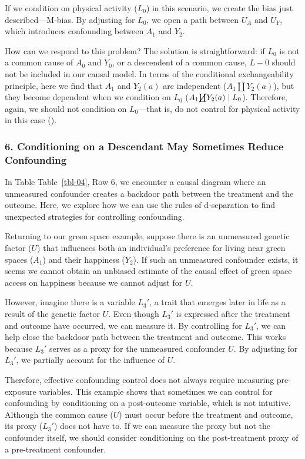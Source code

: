 \documentclass[
  singlecolumn]{article}
\begin{document}
If we condition on physical activity (\(L_0\)) in this scenario, we
create the bias just described---M-bias. By adjusting for \(L_0\), we
open a path between \(U_A\) and \(U_Y\), which introduces confounding
between \(A_1\) and \(Y_2\).

How can we respond to this problem? The solution is straightforward: if
\(L_0\) is not a common cause of \(A_0\) and \(Y_0\), or a descendent of
a common cause, \(L-0\) should not be included in our causal model. In
terms of the conditional exchangeability principle, here we find that
\(A_1\) and \(Y_2(a)\) are independent (\(A_1 \coprod Y_2(a)\)), but
they become dependent when we condition on \(L_0\)
(\(A_1 \cancel{\coprod} Y_2(a) \mid L_0\)). Therefore, again, we should
not condition on \(L_0\)---that is, do not control for physical activity
in this case ().

\subsubsection{6. Conditioning on a Descendant May Sometimes Reduce
Confounding}\label{section-conditioning-on-descendents}

In Table Table~\ref{tbl-04}, Row 6, we encounter a causal diagram where
an unmeasured confounder creates a backdoor path between the treatment
and the outcome. Here, we explore how we can use the rules of
d-separation to find unexpected strategies for controlling confounding.

Returning to our green space example, suppose there is an unmeasured
genetic factor (\(U\)) that influences both an individual's preference
for living near green spaces (\(A_1\)) and their happiness (\(Y_2\)). If
such an unmeasured confounder exists, it seems we cannot obtain an
unbiased estimate of the causal effect of green space access on
happiness because we cannot adjust for \(U\).

However, imagine there is a variable \(L_3'\), a trait that emerges
later in life as a result of the genetic factor \(U\). Even though
\(L_3'\) is expressed after the treatment and outcome have occurred, we
can measure it. By controlling for \(L_3'\), we can help close the
backdoor path between the treatment and outcome. This works because
\(L_3'\) serves as a proxy for the unmeasured confounder \(U\). By
adjusting for \(L_3'\), we partially account for the influence of \(U\).

Therefore, effective confounding control does not always require
measuring pre-exposure variables. This example shows that sometimes we
can control for confounding by conditioning on a post-outcome variable,
which is not intuitive. Although the common cause (\(U\)) must occur
before the treatment and outcome, its proxy (\(L_3'\)) does not have to.
If we can measure the proxy but not the confounder itself, we should
consider conditioning on the post-treatment proxy of a pre-treatment
confounder.
\end{document}
